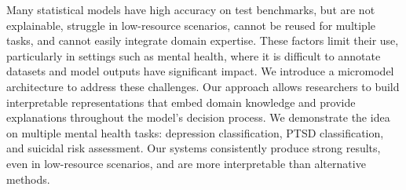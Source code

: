 Many statistical models have high accuracy on test benchmarks, but are not explainable, struggle in low-resource scenarios, cannot be reused for multiple tasks, and cannot easily integrate domain expertise. These factors limit their use, particularly in settings such as mental health, where it is difficult to annotate datasets and model outputs have significant impact. We introduce a micromodel architecture to address these challenges. Our approach allows researchers to build interpretable representations that embed domain knowledge and provide explanations throughout the model's decision process. We demonstrate the idea on multiple mental health tasks: depression classification, PTSD classification, and suicidal risk assessment. Our systems consistently produce strong results, even in low-resource scenarios, and are more interpretable than alternative methods.
